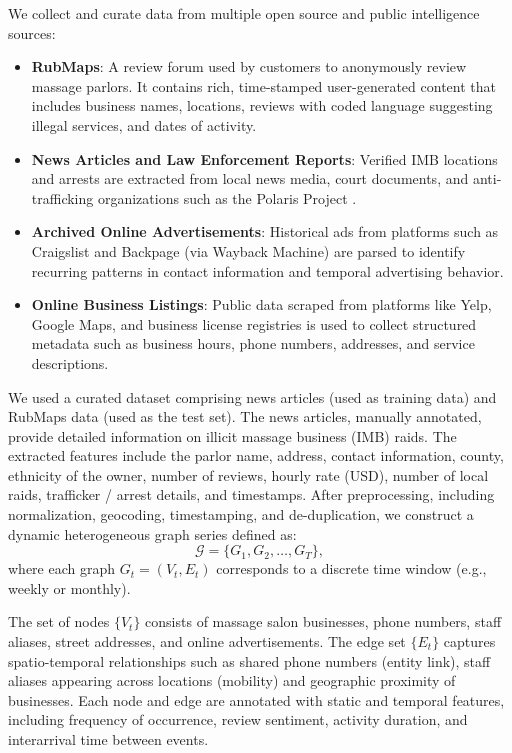\documentclass[letterpaper]{article} %
\begin{document}
We collect and curate data from multiple open source and public intelligence sources:

\begin{itemize}
    \item \textbf{RubMaps}: A review forum used by customers to anonymously review massage parlors. It contains rich, time-stamped user-generated content that includes business names, locations, reviews with coded language suggesting illegal services, and dates of activity.
    \item \textbf{News Articles and Law Enforcement Reports}: Verified IMB locations and arrests are extracted from local news media, court documents, and anti-trafficking organizations such as the Polaris Project \cite{latonero2011human}.
    \item \textbf{Archived Online Advertisements}: Historical ads from platforms such as Craigslist and Backpage (via Wayback Machine) are parsed to identify recurring patterns in contact information and temporal advertising behavior.
    \item \textbf{Online Business Listings}: Public data scraped from platforms like Yelp, Google Maps, and business license registries is used to collect structured metadata such as business hours, phone numbers, addresses, and service descriptions.
\end{itemize}

We used a curated dataset comprising news articles (used as training data) and RubMaps data (used as the test set). The news articles, manually annotated, provide detailed information on illicit massage business (IMB) raids. The extracted features include the parlor name, address, contact information, county, ethnicity of the owner, number of reviews, hourly rate (USD), number of local raids, trafficker / arrest details, and timestamps. After preprocessing, including normalization, geocoding, timestamping, and de-duplication, we construct a dynamic heterogeneous graph series defined as:
\[ 
\mathcal{G} = \{ G_1, G_2, \dots, G_T \},
\]
where each graph \( G_t = (V_t, E_t) \) corresponds to a discrete time window (e.g., weekly or monthly).

The set of nodes $\{V_t\}$ consists of massage salon businesses, phone numbers, staff aliases, street addresses, and online advertisements. The edge set $\{E_t\}$ captures spatio-temporal relationships such as shared phone numbers (entity link), staff aliases appearing across locations (mobility) and geographic proximity of businesses. Each node and edge are annotated with static and temporal features, including frequency of occurrence, review sentiment, activity duration, and interarrival time between events.
\end{document}
